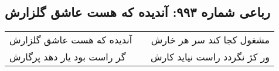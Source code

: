 \begin{center}
\section*{رباعی شماره ۹۹۳: آندیده که هست عاشق گلزارش}
\label{sec:0993}
\begin{longtable}{l p{0.5cm} r}
آندیده که هست عاشق گلزارش
&&
مشغول کجا کند سر هر خارش
\\
گر راست بود یار دهد پرگارش
&&
ور کژ نگردد راست نیاید کارش
\\
\end{longtable}
\end{center}
